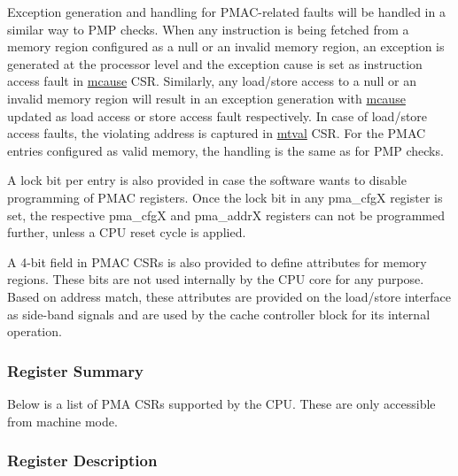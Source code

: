 \documentclass[main\_\_EN.tex]{subfiles}
\begin{document}
Exception generation and handling for PMAC-related faults will be handled in a similar way to PMP checks. When any instruction is being fetched from a memory region configured as a null or an invalid memory region, an exception is generated at the processor level and the exception cause is set as instruction access fault in \hyperref[regdesc:MCAUSE]{mcause} CSR. Similarly, any load/store access to a null or an invalid memory region will result in an exception generation with \hyperref[regdesc:MCAUSE]{mcause} updated as load access or store access fault respectively. In case of load/store access faults, the violating address is captured in \hyperref[regdesc:MTVAL]{mtval} CSR. For the PMAC entries configured as valid memory, the handling is the same as for PMP checks.

A lock bit per entry is also provided in case the software wants to disable programming of PMAC registers. Once the lock bit in any pma\_cfgX register is set, the respective pma\_cfgX and pma\_addrX registers can not be programmed further, unless a CPU reset cycle is applied.

A 4-bit field in PMAC CSRs is also provided to define attributes for memory regions. These bits are not used internally by the CPU core for any purpose. Based on address match, these attributes are provided on the load/store interface as side-band signals and are used by the cache controller block for its internal operation.


\newpage
\hypertarget{riscvcpu-pma-reg-summ}{}
\subsubsection{Register Summary}
\label{sec:riscvcpu-pma-reg-summ}


Below is a list of PMA CSRs supported by the CPU. These are only accessible from machine mode.




\subsubsection{Register Description}
\label{sec:riscvcpu-pma-reg-desc}


\end{document}
